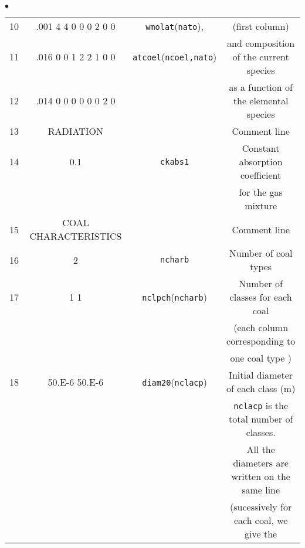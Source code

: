 {{{\begin{list}{$\bullet$}{}
\begin{table}[htbp]
\begin{center}
{\begin{tabular}{|c|c|c|c|}
  10    &  .001  4  4  0  0  0  2  0  0  &\texttt{wmolat\index{wmolat}}(\texttt{nato}),    & (first column)                                       \\
  11    &  .016  0  0  1  2  2  1  0  0  &\texttt{atcoel\index{atcoel}}(\texttt{ncoel,nato})& and composition of the current species              \\
  12    &  .014  0  0  0  0  0  0  2  0  &                               & as a function of the elemental species               \\ \hline
  13    &          RADIATION             &                               & Comment line                                         \\ \hline
  14    &               0.1              & \texttt{ckabs1\index{ckabs1}}  & Constant absorption coefficient                      \\
        &                                &                               & for the gas mixture                                  \\ \hline
  15    &   COAL CHARACTERISTICS         &                               & Comment line                                         \\ \hline
  16    &               2                & \texttt{ncharb\index{ncharb}} & Number of coal types                                 \\ \hline
  17    &         1            1         & \texttt{nclpch\index{nclpch}}(\texttt{ncharb}) & Number of classes for each coal                      \\
        &                                &                               & (each column corresponding to                        \\
        &                                &                               & one coal type )                                      \\ \hline
  18    &    50.E-6        50.E-6        & \texttt{diam20\index{diam20}}(\texttt{nclacp})  & Initial diameter of each class (m)                   \\
        &                                &                               & \texttt{nclacp\index{nclacp}} is the total number of classes. \\
        &                                &                               & All the diameters are written on the same line       \\
        &                                &                               & (sucessively for each coal, we give the              \\

\end{tabular}}
\end{center}
\end{table}
\end{list}}}}
